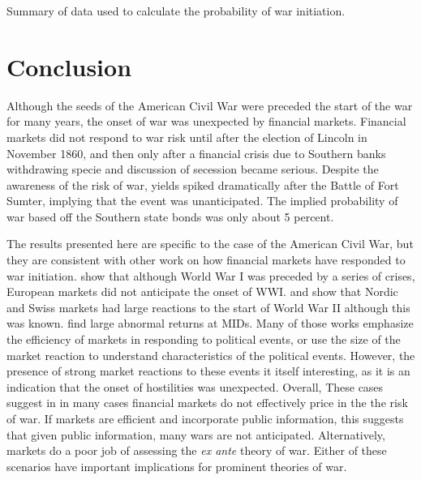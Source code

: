 \begin{table}
  \centering
  
  \caption{Summary of data used to calculate the probability of war initiation.}
\label{acw_onset:tab:prwar1}
\end{table}

\section{Conclusion}
\label{acw_onset:sec:conclusion}

Although the seeds of the American Civil War were preceded the start of the war for many years, the onset of war was unexpected by financial markets.
Financial markets did not respond to war risk until after the election of Lincoln in November 1860, and then only after a financial crisis due to Southern banks withdrawing specie and discussion of secession became serious.
Despite the awareness of the risk of war, yields spiked dramatically after the Battle of Fort Sumter, implying that the event was unanticipated.
The implied probability of war based off the Southern state bonds was only about 5 percent.

The results presented here are specific to the case of the American Civil War, but they are consistent with other work on how financial markets have responded to war initiation.
\textcite{Ferguson2006} show that although World War I was preceded by a series of crises, European markets did not anticipate the onset of WWI.
\textcite{FreyKucher2000} and \textcite{WaldenstromFrey2008} show that Nordic and Swiss markets had large reactions to the start of World War II although this was known.
\textcite{GuidolinLaFerrara2010} find large abnormal returns at MIDs.
Many of those works emphasize the efficiency of markets in responding to political events, or use the size of the market reaction to understand characteristics of the political events.
However, the presence of strong market reactions to these events it itself interesting, as it is an indication that the onset of hostilities was unexpected.
Overall, These cases suggest in in many cases financial markets do not effectively price in the the risk of war.
If markets are efficient and incorporate public information, this suggests that given public information, many wars are not anticipated.
Alternatively, markets do a poor job of assessing the \textit{ex ante} theory of war.
Either of these scenarios have important implications for prominent theories of war.

